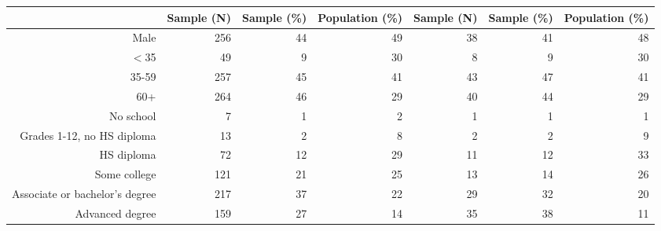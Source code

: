\begin{table}[ht]
\centering
\begin{tabular}{rrrrrrr}
  \hline
 & Sample (N) & Sample (\%) & Population (\%) & Sample (N) & Sample (\%) & Population (\%) \\ 
  \hline
Male & 256 & 44 & 49 & 38 & 41 & 48 \\ 
  $<$35 & 49 & 9 & 30 & 8 & 9 & 30 \\ 
  35-59 & 257 & 45 & 41 & 43 & 47 & 41 \\ 
  60+ & 264 & 46 & 29 & 40 & 44 & 29 \\ 
  No school & 7 & 1 & 2 & 1 & 1 & 1 \\ 
  Grades 1-12, no HS diploma & 13 & 2 & 8 & 2 & 2 & 9 \\ 
  HS diploma & 72 & 12 & 29 & 11 & 12 & 33 \\ 
  Some college & 121 & 21 & 25 & 13 & 14 & 26 \\ 
  Associate or bachelor's degree & 217 & 37 & 22 & 29 & 32 & 20 \\ 
  Advanced degree & 159 & 27 & 14 & 35 & 38 & 11 \\ 
   \hline
\end{tabular}
\end{table}
